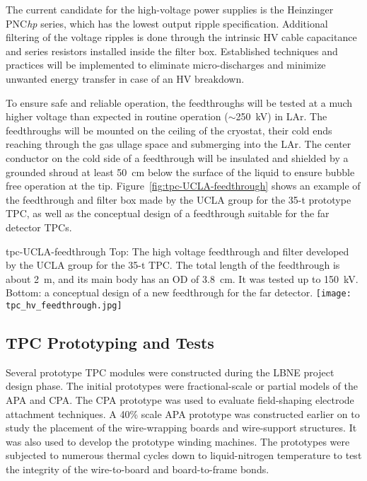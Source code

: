 The current candidate for the high-voltage power supplies is the
Heinzinger PNC{\it hp} series, which has the lowest output ripple
specification.  Additional filtering of the voltage ripples is done
through the intrinsic HV cable capacitance and series resistors
installed inside the filter box. Established techniques and practices
will be implemented to eliminate micro-discharges and minimize
unwanted energy transfer in case of an HV breakdown.
  
To ensure safe and reliable operation, the feedthroughs will be tested
at a much higher voltage than expected in routine operation
($\sim$250~kV) in LAr. The feedthroughs will be mounted on
the ceiling of the cryostat, their cold ends reaching through the gas
ullage space and submerging into the LAr. The center
conductor on the cold side of a feedthrough will be insulated and
shielded by a grounded shroud at least 50~cm below the surface of the
liquid to ensure bubble free operation at the
tip. Figure~\ref{fig:tpc-UCLA-feedthrough} shows an example of the
feedthrough and filter box made by the UCLA group for the 35-t prototype TPC,
as well as the conceptual design of a feedthrough suitable for the far
detector TPCs.
\begin{cdrfigure}{tpc-UCLA-feedthrough}
{Top: The high voltage feedthrough and filter developed by the UCLA 
group for the 35-t TPC. The total length of the feedthrough is about 2~m, and its main body has an OD of 3.8~cm.  It was tested up to 150~kV.  
Bottom: a conceptual design of a new feedthrough for the far detector.}
\texttt{[image: tpc\_hv\_feedthrough.jpg]}
\end{cdrfigure}


\subsection{TPC Prototyping and Tests}
\label{subsec:fd-ref-tpc-proto}


Several prototype TPC modules were constructed during the LBNE project
design phase.  The initial prototypes were fractional-scale or partial
models of the APA and CPA. The CPA prototype was used to evaluate
field-shaping electrode attachment techniques. A 40\% scale APA
prototype was constructed earlier on to study the placement of the
wire-wrapping boards and wire-support structures. It was also used to
develop the prototype winding machines. The prototypes were subjected
to numerous thermal cycles down to liquid-nitrogen temperature to test
the integrity of the wire-to-board and board-to-frame bonds.

